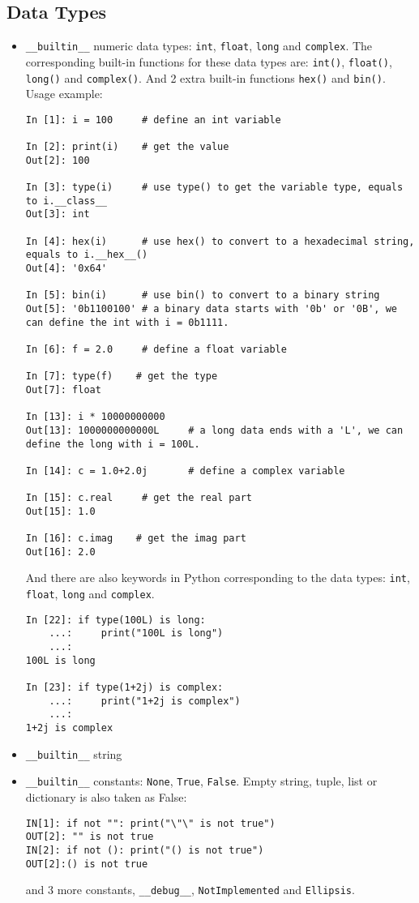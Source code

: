\subsection{Data Types}
\begin{itemize}
\item
\verb/__builtin__/ numeric data types: \verb/int/, \verb/float/, \verb/long/ and \verb/complex/.
The corresponding built-in functions for these data types are:
\verb/int()/, \verb/float()/, \verb/long()/ and
\verb/complex()/.  And 2 extra built-in functions \verb/hex()/ and \verb/bin()/.
Usage example:

\begin{lstlisting}
In [1]: i = 100     # define an int variable

In [2]: print(i)    # get the value
Out[2]: 100

In [3]: type(i)     # use type() to get the variable type, equals to i.__class__
Out[3]: int

In [4]: hex(i)      # use hex() to convert to a hexadecimal string, equals to i.__hex__()
Out[4]: '0x64'

In [5]: bin(i)      # use bin() to convert to a binary string
Out[5]: '0b1100100' # a binary data starts with '0b' or '0B', we can define the int with i = 0b1111.

In [6]: f = 2.0     # define a float variable

In [7]: type(f)    # get the type
Out[7]: float

In [13]: i * 10000000000    
Out[13]: 1000000000000L     # a long data ends with a 'L', we can define the long with i = 100L.

In [14]: c = 1.0+2.0j       # define a complex variable

In [15]: c.real     # get the real part
Out[15]: 1.0

In [16]: c.imag    # get the imag part
Out[16]: 2.0
\end{lstlisting}

And there are also keywords in Python corresponding to the data types:
\verb/int/, \verb/float/, \verb/long/ and \verb/complex/.

\begin{lstlisting}
In [22]: if type(100L) is long:
    ...:     print("100L is long")
    ...: 
100L is long

In [23]: if type(1+2j) is complex:
    ...:     print("1+2j is complex")
    ...: 
1+2j is complex
\end{lstlisting}

\item
 \verb/__builtin__/ string

\item
\verb/__builtin__/ constants: \verb/None/, \verb/True/, \verb/False/. Empty string, tuple, list
or dictionary is also taken as False:

\begin{lstlisting}
IN[1]: if not "": print("\"\" is not true")
OUT[2]: "" is not true 
IN[2]: if not (): print("() is not true")
OUT[2]:() is not true
\end{lstlisting}

and 3 more constants, \verb/__debug__/, \verb/NotImplemented/ and \verb/Ellipsis/.
\end{itemize}

